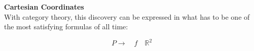 \documentclass{article}
\begin{document}
\textbf{Cartesian Coordinates} \\

With category theory, this discovery can be expressed in what has to be one of the most satisfying formulas of all time: 

\[ P \rightarrow{\quad f \quad} \mathbb{R}^{2}\]
\end{document}
